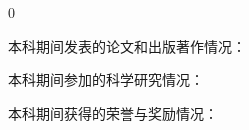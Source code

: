 \begin{publications}{0}

\item {\songbf{} 本科期间发表的论文和出版著作情况：}
\vspace{\baselineskip}

\item {\songbf{} 本科期间参加的科学研究情况：}
\vspace{\baselineskip}

\item {\songbf{} 本科期间获得的荣誉与奖励情况：}

\end{publications}



